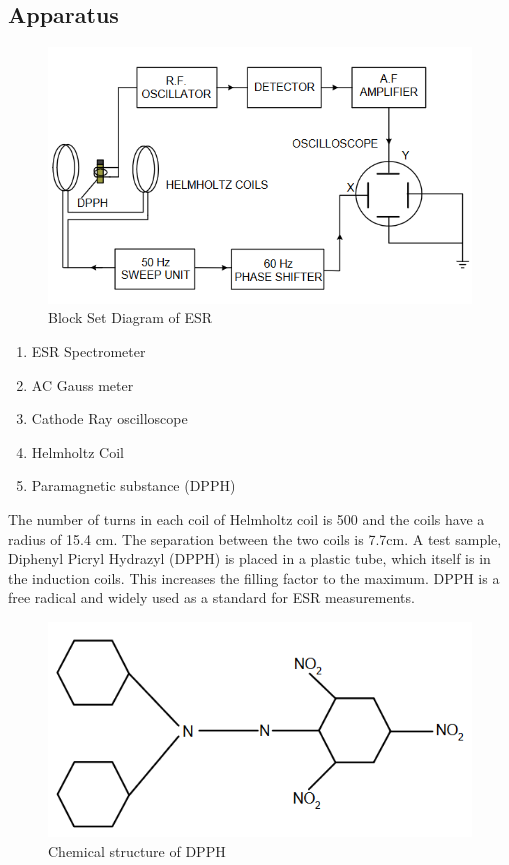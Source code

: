 \subsection*{Apparatus}
\begin{figure}[H]
    \centering
    \includegraphics[width=1\columnwidth]{images/f2.png}
    \caption{Block Set Diagram of ESR}
    \label{f3}
\end{figure}
\begin{enumerate}
    \item ESR Spectrometer
    \item AC Gauss meter
    \item Cathode Ray oscilloscope
    \item Helmholtz Coil
    \item Paramagnetic substance (DPPH)\\
\end{enumerate}



The number of turns in each coil of Helmholtz coil
is 500 and the coils have a radius of 15.4 cm. The
separation between the two coils is 7.7cm.
A test sample, Diphenyl Picryl Hydrazyl (DPPH)
is placed in a plastic tube, which itself is in the
induction coils. This increases the filling factor to
the maximum. DPPH is a free radical and widely
used as a standard for ESR measurements.

\begin{figure}[H]
    \centering
    \includegraphics[width=.6\columnwidth]{images/f4.png}
    \caption{Chemical structure of DPPH}
\end{figure}
